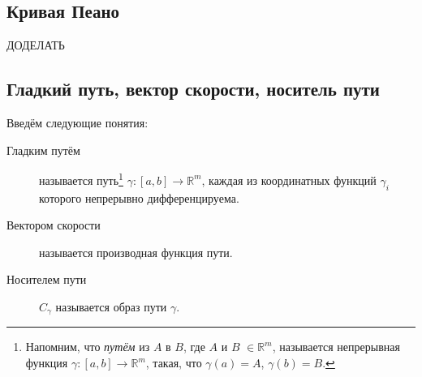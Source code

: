 \subsection{Кривая Пеано}

\begin{example}
	ДОДЕЛАТЬ
\end{example}

\subsection{Гладкий путь, вектор скорости, носитель пути}

\begin{definition}
	Введём следующие понятия:
	\begin{description}
		\item[Гладким путём] называется путь\footnote{Напомним, что \textit{путём} из \(A\) в \(B\), где \(A\) и \(B\) \(\in \mathbb{R}^m\), называется непрерывная функция \(\gamma \colon [a, b] \to \mathbb{R}^m\), такая, что \(\gamma(a) = A\), \(\gamma(b) = B\).} \(\gamma \colon [a, b] \to \mathbb{R}^m\), каждая из координатных функций \(\gamma_i\) которого непрерывно дифференцируема.
		\item[Вектором скорости] называется производная функция пути.
		\item[Носителем пути] \(C_\gamma\) называется образ пути \(\gamma\).
	\end{description}
\end{definition}